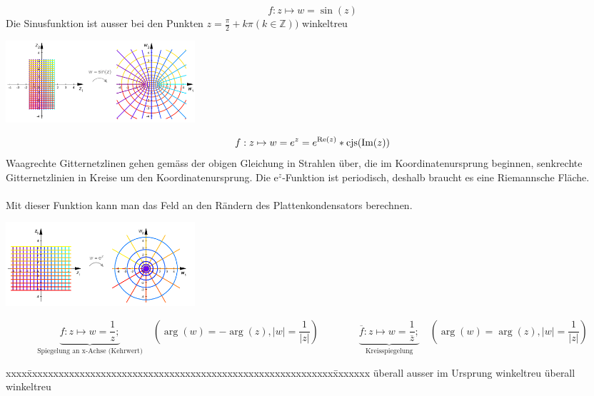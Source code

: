 	 \begin{minipage}{10cm}
		$$ f : z \mapsto w = \sin(z) $$    
		Die Sinusfunktion ist ausser bei den Punkten $z = \frac{\pi}{2}+ k\pi (k \in
		\mathbb{Z}))$ winkeltreu
	\end{minipage}
	\hspace{2cm}
	\begin{minipage}{7cm}
		\includegraphics[width=7cm]{./bilder/sinus.png} 
	
	\end{minipage}

	\begin{minipage}{11cm}
		$$ f : z \mapsto w = e^z =e^{\text{Re}(z)}*\operatorname{cjs}(\text{Im}(z))$$
		Waagrechte Gitternetzlinen gehen gemäss der obigen Gleichung in Strahlen
		über, die im Koordinatenursprung beginnen, senkrechte Gitternetzlinien in
		Kreise um den Koordinatenursprung. Die e$^z$-Funktion ist periodisch, deshalb
		braucht es eine Riemannsche Fläche.\\ \\
		Mit dieser Funktion kann man das Feld an den Rändern des Plattenkondensators
		berechnen. 
	\end{minipage}
	\hspace{1cm}
	\begin{minipage}{7cm}
		\includegraphics[width=7cm]{./bilder/exponentional.png} 		
	\end{minipage}
	$$\underbrace{f : z \mapsto w = \frac{1}{z};}_\text{Spiegelung an x-Achse (Kehrwert)} \quad (\arg(w) = -\arg(z), |w| = \frac{1}{|z|})
	\qquad \qquad 
	\underbrace{\overline{f}: z \mapsto w = \frac{1}{\overline{z}};}_\text{Kreisspiegelung}  \quad  
	(\arg(w) = \arg(z), |w| = \frac{1}{|z|}) $$
	\begin{tabbing}
		xxxx\=xxxxxxxxxxxxxxxxxxxxxxxxxxxxxxxxxxxxxxxxxxxxxxxxxxxxxxxxxx\=xxxxxxx\kill
		\> überall ausser im Ursprung winkeltreu \> überall winkeltreu
	\end{tabbing}



